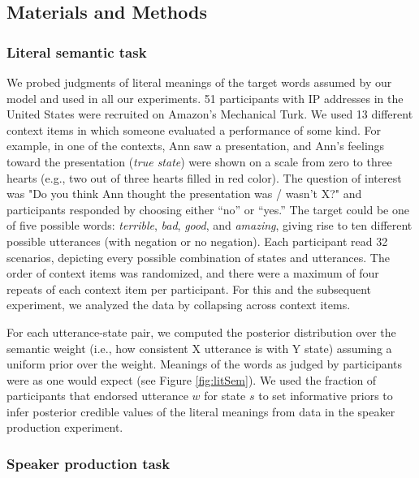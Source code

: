 \documentclass[12pt]{article}
\begin{document}
\subsection*{Materials and Methods}

\subsubsection*{Literal semantic task}

We probed judgments of literal meanings of the target words assumed by our model and used in all our experiments. 
51 participants with IP addresses in the United States were recruited on Amazon's Mechanical Turk. 
We used 13 different context items in which someone evaluated a performance of some kind. 
For example, in one of the contexts, Ann saw a presentation, and Ann's feelings toward the presentation (\emph{true state}) were shown on a scale from zero to three hearts 
(e.g., two out of three hearts filled in red color). 
The question of interest was "Do you think Ann thought the presentation was / wasn't X?" and participants responded by choosing either \enquote{no} or \enquote{yes.}  
The target could be one of five possible words: \emph{terrible}, \emph{bad}, \emph{good}, and \emph{amazing}, giving rise to ten different possible utterances (with negation or no negation). 
Each participant read 32 scenarios, depicting every possible combination of states and utterances. 
The order of context items was randomized, and there were a maximum of four repeats of each context item per participant. 
For this and the subsequent experiment, we analyzed the data by collapsing across context items. 

For each utterance-state pair, we computed the posterior distribution over the semantic weight 
(i.e., how consistent X utterance is with Y state) assuming a uniform prior over the weight.
Meanings of the words as judged by participants were as one would expect (see Figure \ref{fig:litSem}). 
We used the fraction of participants that endorsed utterance $w$ for state $s$ to set informative priors to infer posterior credible values of the literal meanings from data in the speaker production experiment.

\subsubsection*{Speaker production task}
\end{document}

